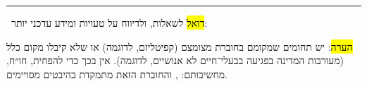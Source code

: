 \vfill

\hrule

~\hfill \hl{דואל} לשאלות, ולדיווח על טעויות ומידע עדכני יותר: \hfill~

\small \hl{הערה}: יש תחומים שמקומם בחוברת מצומצם (קפיטליזם, לדוגמה) או שלא קיבלו מקום כלל (מעורבות המדינה בפגיעה בבעלי־חיים לא אנושיים, לדוגמה). אין בכך כדי להפחית, חו״ח, מחשיבותם: , והחוברת הזאת מתמקדת בהיבטים מסויימים.
